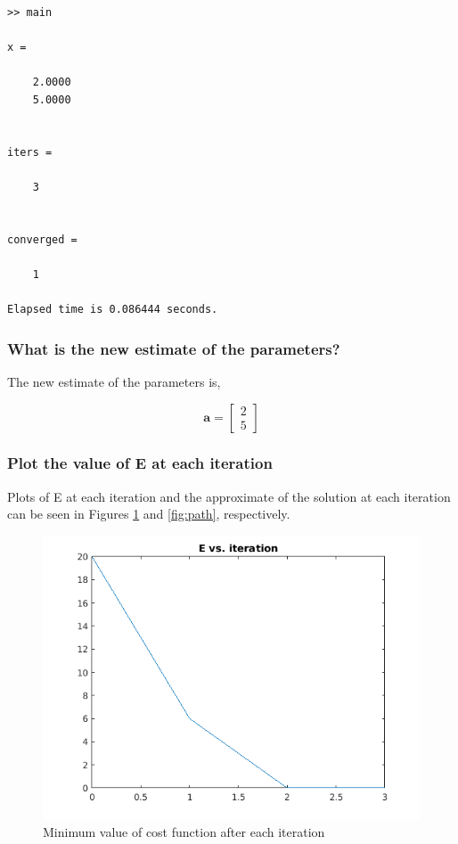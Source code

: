 \documentclass{article}
\begin{document}
\vspace{0.25in}

\begin{verbatim}
>> main

x =

	2.0000
	5.0000


iters =

	3


converged =

	1

Elapsed time is 0.086444 seconds.

\end{verbatim}

\vspace{0.25in}

\subsubsection{What is the new estimate of the parameters?}

The new estimate of the parameters is,

\begin{equation*}
\mathbf{a} = \begin{bmatrix} 2 \\ 5 \end{bmatrix}
\end{equation*}

\subsubsection{Plot the value of E at each iteration}

Plots of E at each iteration and the approximate of the solution at each iteration can be seen in Figures \ref{fig:error} and \ref{fig:path}, respectively.

\begin{figure}
	\centering
	\includegraphics[width=0.75\linewidth]{E-vs-iteration}
	\caption{Minimum value of cost function after each iteration}
	\label{fig:error}
\end{figure}
\end{document}
